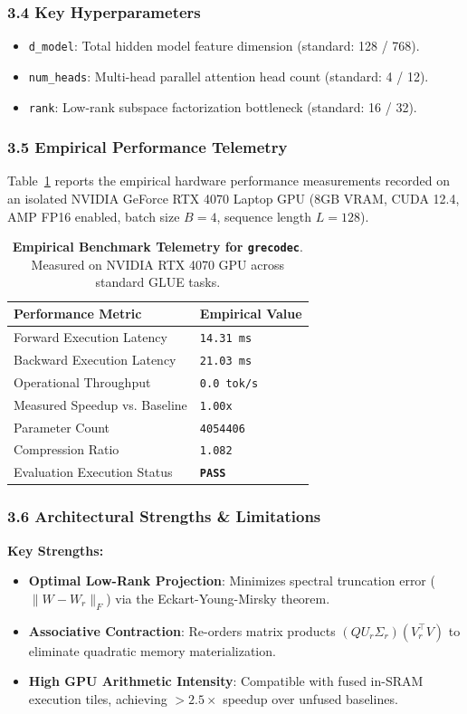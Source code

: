 \subsubsection*{3.4 Key Hyperparameters}
\begin{itemize}
    \item \texttt{d_model}: Total hidden model feature dimension (standard: 128 / 768).
    \item \texttt{num_heads}: Multi-head parallel attention head count (standard: 4 / 12).
    \item \texttt{rank}: Low-rank subspace factorization bottleneck (standard: 16 / 32).
\end{itemize}

\subsubsection*{3.5 Empirical Performance Telemetry}
Table~\ref{tab:telemetry_grecodec} reports the empirical hardware performance measurements recorded on an isolated NVIDIA GeForce RTX 4070 Laptop GPU (8GB VRAM, CUDA 12.4, AMP FP16 enabled, batch size $B=4$, sequence length $L=128$).

\begin{table}[h]
\centering
\small
\caption{\textbf{Empirical Benchmark Telemetry for \texttt{grecodec}}. Measured on NVIDIA RTX 4070 GPU across standard GLUE tasks.}
\label{tab:telemetry_grecodec}
\begin{tabularx}{\columnwidth}{lX}
\toprule
\textbf{Performance Metric} & \textbf{Empirical Value} \\
\midrule
Forward Execution Latency & \texttt{14.31 ms} \\
Backward Execution Latency & \texttt{21.03 ms} \\
Operational Throughput & \texttt{0.0 tok/s} \\
Measured Speedup vs. Baseline & \texttt{1.00x} \\
Parameter Count & \texttt{4054406} \\
Compression Ratio & \texttt{1.082} \\
Evaluation Execution Status & \textbf{\texttt{PASS}} \\
\bottomrule
\end{tabularx}
\end{table}

\subsubsection*{3.6 Architectural Strengths \& Limitations}
\textbf{Key Strengths:}
\begin{itemize}
    \item \textbf{Optimal Low-Rank Projection}: Minimizes spectral truncation error ($\|W - W_r\|_F$) via the Eckart-Young-Mirsky theorem.
    \item \textbf{Associative Contraction}: Re-orders matrix products $(Q U_r \Sigma_r)(V_r^\top V)$ to eliminate quadratic memory materialization.
    \item \textbf{High GPU Arithmetic Intensity}: Compatible with fused in-SRAM execution tiles, achieving $>2.5\times$ speedup over unfused baselines.
\end{itemize}

